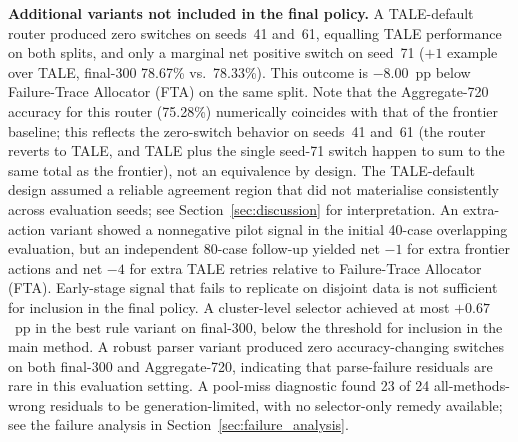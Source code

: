 \medskip\noindent\textbf{Additional variants not included in the final policy.}
A TALE-default router produced zero switches on seeds~41 and~61,
equalling TALE performance on both splits, and only a marginal net positive
switch on seed~71 ($+1$ example over TALE, final-300 78.67\% vs.\ 78.33\%).
This outcome is $-8.00$~pp below Failure-Trace Allocator (FTA) on the same split.
Note that the Aggregate-720 accuracy for this router (75.28\%) numerically coincides
with that of the frontier baseline; this reflects the zero-switch behavior on
seeds~41 and~61 (the router reverts to TALE, and TALE plus the single seed-71 switch
happen to sum to the same total as the frontier), not an equivalence by design.
The TALE-default design assumed a reliable agreement region that did not
materialise consistently across evaluation seeds; see Section~\ref{sec:discussion}
for interpretation.
An extra-action variant showed a nonnegative pilot signal in the
initial 40-case overlapping evaluation, but an independent 80-case follow-up
yielded net $-1$ for extra frontier actions and net $-4$ for extra TALE
retries relative to Failure-Trace Allocator (FTA).
Early-stage signal that fails to replicate on disjoint data is not sufficient
for inclusion in the final policy.
A cluster-level selector achieved at most $+0.67$~pp in the best rule
variant on final-300, below the threshold for inclusion in the main method.
A robust parser variant produced zero accuracy-changing switches on
both final-300 and Aggregate-720, indicating that parse-failure residuals are
rare in this evaluation setting.
A pool-miss diagnostic found 23 of 24 all-methods-wrong residuals to be
generation-limited, with no selector-only remedy available; see the failure
analysis in Section~\ref{sec:failure_analysis}.
